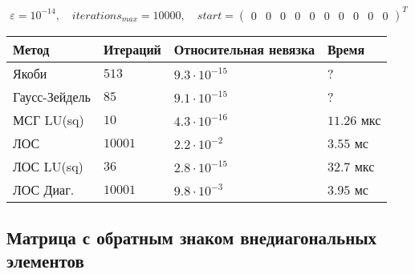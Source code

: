 $$ \varepsilon = 10^{-14}, \quad iterations_{max} = 10000, \quad start = \begin{pmatrix} 0 & 0 & 0 & 0 & 0 & 0 & 0 & 0 & 0 & 0 \end{pmatrix}^T $$

\setlength{\tabcolsep}{2pt}
\tabulinesep=0.3mm
\noindent\begin{tabu}{|X[-1,l]|X[-1,l]|X[-1,l]|X[-1,l]|}
\hline
Метод & Итераций & Относительная невязка & Время \\ \hline
Якоби & $513$ & $9.3\cdot 10^{-15}$ & ? \\ \hline
Гаусс-Зейдель & $85$ & $9.1 \cdot 10^{-15}$ & ? \\ \hline
{}
МСГ LU(sq) & $10$ & $4.3 \cdot 10^{-16}$ & $11.26$ мкс \\ \hline
{}
ЛОС & $10001$ & $2.2 \cdot 10^{-2}$ & $3.55$ мс \\ \hline
ЛОС LU(sq) & $36$ & $2.8 \cdot 10^{-15}$ & $32.7$ мкс \\ \hline
{}
ЛОС Диаг. & $10001$ & $9.8 \cdot 10^{-3}$ & $3.95$ мс \\ \hline 
\end{tabu}

\subsection{Матрица с обратным знаком внедиагональных элементов}

